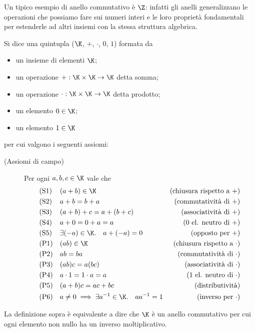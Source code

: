 Un tipico esempio di anello commutativo è $\Z$: infatti gli anelli generalizzano le operazioni che possiamo fare sui numeri interi e le loro proprietà fondamentali per estenderle ad altri insiemi con la stessa struttura algebrica.

\begin{definition}[Campo]
    Si dice  una quintupla ($\K$, $+$, $\cdot$, $0$, $1$) formata da
    \begin{itemize}
        \item un insieme di elementi $\K$;
        \item un operazione $+ : \K \times \K \to \K$ detta somma;
        \item un operazione $\cdot : \K \times \K \to \K$ detta prodotto;
        \item un elemento $0 \in \K$;
        \item un elemento $1 \in \K$
    \end{itemize}  per cui valgono i seguenti assiomi: 
    \begin{description}
        \item[(Assiomi di campo)] Per ogni $a, b, c \in \K$ vale che
        \begin{align*}
            &\text{(S1)}      &&(a+b) \in \K           &\text{(chiusura rispetto a $+$)}\\
            &\text{(S2)}      &&a+b = b+a             &\text{(commutatività di $+$)}\\
            &\text{(S3)}      &&(a+b)+c = a+(b+c)     &\text{(associatività di $+$)}\\
            &\text{(S4)}      &&a+0=0+a=a             &\text{(0 el. neutro di $+$)}\\
            &\text{(S5)}      &&\exists (-a) \in \K. \quad a+(-a) = 0 &\text{(opposto per $+$)}\\
            &\text{(P1)}      &&(ab) \in \K            &\text{(chiusura rispetto a $\cdot$)}\\        
            &\text{(P2)}      &&ab = ba               &\text{(commutatività di $\cdot$)}\\
            &\text{(P3)}      &&(ab)c = a(bc)         &\text{(associatività di $\cdot$)}\\
            &\text{(P4)}      &&a \cdot 1=1 \cdot a=a &\text{(1 el. neutro di $\cdot$)}\\
            &\text{(P5)}     &&(a+b)c = ac + bc      &\text{(distributività)} \\
            &\text{(P6)}     &&a \neq 0 \implies \exists a^{-1} \in \K. \quad aa^{-1} = 1 &\text{(inverso per $\cdot$)}
        \end{align*}
    \end{description} 

    La definizione sopra è equivalente a dire che $\K$ è un anello commutativo per cui ogni elemento non nullo ha un inverso moltiplicativo.
\end{definition}

